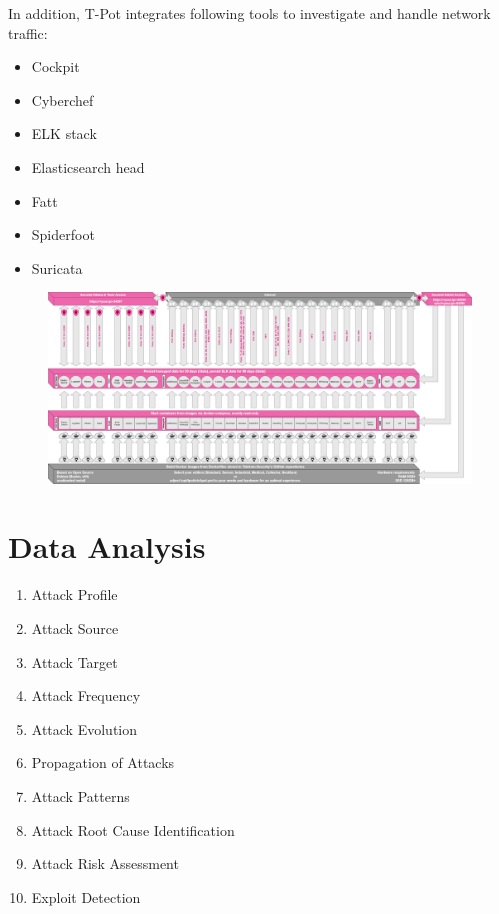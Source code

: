 In addition, T-Pot integrates following tools to investigate and handle network traffic:

\begin{itemize}
    \item Cockpit
    \item Cyberchef
    \item ELK stack
    \item Elasticsearch head
    \item Fatt
    \item Spiderfoot
    \item Suricata
\end{itemize}



\begin{figure}
    \centering
    \includegraphics[width=\textwidth]{figures/architecture.png}
    \caption{}
    \label{fig:overview-tpot}
\end{figure}

\section{Data Analysis}

\begin{enumerate}
    \item Attack Profile
    \item Attack Source
    \item Attack Target
    \item Attack Frequency
    \item Attack Evolution
    \item Propagation of Attacks
    \item Attack Patterns
    \item Attack Root Cause Identification
    \item Attack Risk Assessment
    \item Exploit Detection
\end{enumerate}

